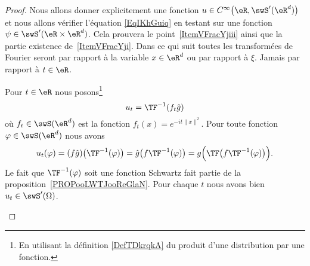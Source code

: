 \begin{proof}
	Nous allons donner explicitement une fonction \( u\in C^{\infty}\big( \eR,\swS'(\eR^d) \big)\) et nous allons vérifier l'équation \eqref{EqIKhGuiq} en testant sur une fonction \( \psi\in\swS'(\eR\times \eR^d)\). Cela prouvera le point~\ref{ItemVFracYjiii} ainsi que la partie existence de~\ref{ItemVFracYji}. Dans ce qui suit toutes les transformées de Fourier seront par rapport à la variable \( x\in \eR^d\) ou par rapport à \( \xi\). Jamais par rapport à \( t\in \eR\).

	\begin{subproof}
		\spitem[Existence]
		Pour \( t\in \eR\) nous posons\footnote{En utilisant la définition \eqref{DefTDkrqkA} du produit d'une distribution par une fonction.}
		\begin{equation}
			u_t=\TF^{-1}(f_t\hat g)
		\end{equation}
		où \( f_t\in\swS(\eR^d)\) est la fonction \( f_t(x)= e^{-it\| x \|^2}\). Pour toute fonction \( \varphi\in\swS(\eR^d)\) nous avons
		\begin{equation}
			u_t(\varphi)=(f\hat g)\big( \TF^{-1}(\varphi) \big)=\hat g\big( f\TF^{-1}(\varphi) \big)=g\Big( \TF\big( f\TF^{-1}(\varphi) \big) \Big).
		\end{equation}
		Le fait que \( \TF^{-1}(\varphi)\) soit une fonction Schwartz fait partie de la proposition~\ref{PROPooLWTJooReGlaN}. Pour chaque \( t\) nous avons bien \( u_t\in\swS'(\Omega)\).


\end{subproof}
\end{proof}
